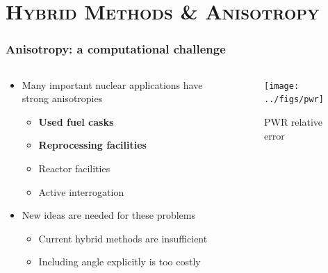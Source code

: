 \documentclass[xcolor=x11names,compress,handout]{beamer}
\renewcommand{\(}{\begin{columns}}
\renewcommand{\)}{\end{columns}}
\newcommand{\<}[1]{\begin{column}{#1}}
\renewcommand{\>}{\end{column}}
\begin{document}
\section{\scshape Hybrid Methods \& Anisotropy}
\begin{frame}[fragile]
  \frametitle{Anisotropy: a computational challenge}

	\begin{columns}
  	\begin{column}{0.5\textwidth}
	\begin{itemize}
	\item Many important nuclear applications have strong anisotropies
	 \begin{itemize}
	 \item \textbf{Used fuel casks}
	 \item \textbf{Reprocessing facilities}
	 \item Reactor facilities
	 \item Active interrogation 
	 \end{itemize}
	\pause
	\item New ideas are needed for these problems
	\begin{itemize}
	\item Current hybrid methods are insufficient
	\item Including angle explicitly is too costly	
	\end{itemize}
	\end{itemize}
  	\end{column}
 	\begin{column}{0.5\textwidth}
 	 \begin{center}
 	 \begin{figure}
 	 \texttt{[image: ../figs/pwr]}  
 	 \caption{PWR relative error \cite{Pantelias2013}}
 	 \end{figure}
 	 \end{center}

  	\end{column}
	\end{columns}

\end{frame}
\end{document}
